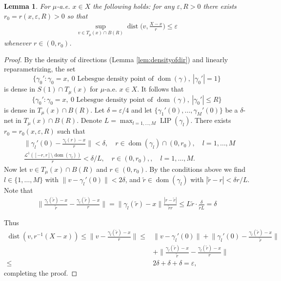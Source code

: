 \documentclass{amsart}
\newtheorem{lemma}[theorem]{Lemma}
\numberwithin{equation}{section}
\newcommand{\leb}{\mathcal{L}}
\newcommand{\dist}{\operatorname{dist}}
\newcommand{\LIP}{\operatorname{LIP}}
\newcommand{\dom}{\operatorname{dom}}
\newcommand{\inv}{^{-1}}
\begin{document}
\begin{lemma}\label{lem:decomp-bundle-subset-of-tangent}
For $\mu$-a.e. $x\in X$ the following holds: for any $\varepsilon,R>0$ there exists $r_0=r(x,\varepsilon,R)>0$ so that 
\begin{align*}
\sup_{v\in T_\mu(x)\cap B(R)}\dist\Big(v,\frac{X-x}{r}\Big)\le \varepsilon
\end{align*}
whenever $r\in (0,r_0)$.
\end{lemma}
\begin{proof}
 By the density of directions (Lemma \ref{lem:densityofdir}) and linearly reparametrizing, the set $$ \{\gamma_0': \gamma_0=x,\ 0\mbox{ Lebesgue density point of }\dom(\gamma),\ |\gamma_0'|=1\}$$ is dense in $S(1)\cap T_\mu(x)$ for $\mu$-a.e. $x\in X$. It follows that 
$$ \{\gamma_0': \gamma_0=x,\ 0\mbox{ Lebesgue density point of }\dom(\gamma),\ |\gamma_0'|\le R\}$$ 
is dense in $T_\mu(x)\cap B(R)$. Let $\delta=\varepsilon/4$ and let $\{\gamma_1'(0),\ldots,\gamma_M'(0)\}$ be a $\delta$-net in $T_\mu(x)\cap B(R)$. Denote $L=\max_{l=1,\ldots,M}\LIP(\gamma_l)$. There exists $r_0=r_0(x,\varepsilon,R)$ such that 
\begin{align*}
    &\Big\|\gamma_l'(0)-\frac{\gamma_l(r)-x}{r}\Big\|<\delta,\quad r\in \dom(\gamma_l)\cap (0,r_0),\quad l=1,\ldots,M\\
    &\frac{\leb^1([-r,r]\setminus \dom(\gamma_l))}{r}<\delta/L,\quad r\in (0,r_0), ,\quad l=1,\ldots,M.
\end{align*}
Now let $v\in T_\mu(x)\cap B(R)$ and $r\in (0,r_0)$. By the conditions above we find $l\in \{1,\ldots,M\}$ with $\|v-\gamma_l'(0)\|<2\delta$, and $\tilde r\in \dom(\gamma_l)$ with $|\tilde r-r|<\delta r/L$. Note that
\begin{align*}
\Big\|\frac{\gamma_l(\tilde r)-x}{\tilde r}-\frac{\gamma_l(\tilde r)-x}{r}\Big\|=\|\gamma_l(\tilde r)-x\|\frac{|r-\tilde r|}{\tilde r r}\le L\tilde r\cdot \frac{\delta}{\tilde r L}=\delta
\end{align*}


Thus
\begin{align*}
\dist(v,r\inv(X-x))\le \Big\|v-\frac{\gamma_l(\tilde r)-x}{r}\Big\|\le &\|v-\gamma_l'(0)\|+\Big\|\gamma_l'(0)-\frac{\gamma_l(\tilde r)-x}{\tilde r}\Big\| \\
&+\Big\|\frac{\gamma_l(\tilde r)-x}{\tilde r}-\frac{\gamma_l(\tilde r)-x}{r}\Big\|\\
\le &2\delta+\delta+\delta=\varepsilon,
\end{align*}
completing the proof.
\end{proof}
\end{document}
